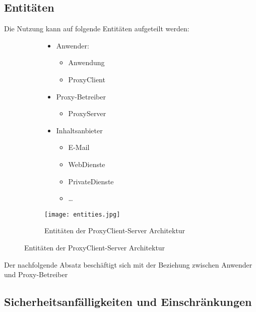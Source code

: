 \documentclass[12pt, a4paper]{scrartcl}
\begin{document}
\subsection{Entitäten}
Die Nutzung kann auf folgende Entitäten aufgeteilt werden:
\begin{figure}[H]
    \centering
    \begin{subfigure}{0.45\textwidth}
        \begin{itemize}
            \item Anwender:
            \begin{itemize}
                \item Anwendung
                \item ProxyClient
            \end{itemize}
            \item Proxy-Betreiber
            \begin{itemize}
                \item ProxyServer
            \end{itemize}
            \item Inhaltsanbieter
            \begin{itemize}
                \item E-Mail
                \item WebDienste
                \item PrivateDienste
                \item \ldots
            \end{itemize}
        \end{itemize}
    \end{subfigure}
    \begin{subfigure}{0.5\textwidth}
        \centering
        \texttt{[image: entities.jpg]}
        \caption{Entitäten der ProxyClient-Server Architektur}
        \label{fig::enti}
    \end{subfigure}
\end{figure}

\noindent Der nachfolgende Absatz beschäftigt sich mit der Beziehung zwischen Anwender und Proxy-Betreiber
\subsection{Sicherheitsanfälligkeiten und Einschränkungen}
\end{document}

